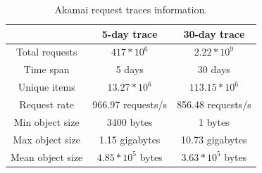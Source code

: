\begin{table}[h!]
	\centering
	\begin{tabular}{| c | c | c |}
		\hline
		& 5-day trace & 30-day trace \\
		\hline 
		Total requests & $ 417 * 10^6 $ & $ 2.22 * 10^9 $ \\ 
		Time span & 5 days & 30 days \\
		Unique items & $ 13.27 * 10^6 $ & $ 113.15 * 10^6 $ \\
		Request rate & 966.97 requests/s & 856.48 requests/s \\
		Min object size & 3400 bytes & 1 bytes \\
		Max object size & 1.15 gigabytes & 10.73 gigabytes \\ 
		Mean object size & $ 4.85 * 10^5 $ bytes & $ 3.63 * 10^5 $ bytes \\
		\hline
	\end{tabular}
	\caption{Akamai request traces information.}
	\label{table:1}
\end{table}

